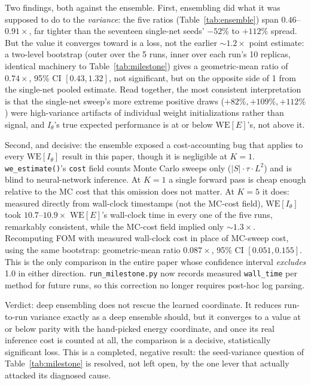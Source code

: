 \documentclass[11pt]{article}
\begin{document}
	Two findings, both against the ensemble. First, ensembling did what it was
	supposed to do to the \emph{variance}: the five ratios (Table~\ref{tab:ensemble}) span
	$0.46$--$0.91\times$, far tighter than the seventeen single-net seeds' $-52\%$ to
	$+112\%$ spread. But the value it converges toward is a loss, not the earlier
	$\sim\!1.2\times$ point estimate: a two-level bootstrap (outer over the 5 runs, inner over
	each run's 10 replicas, identical machinery to Table~\ref{tab:milestone}) gives a
	geometric-mean ratio of $0.74\times$, 95\% CI $[0.43, 1.32]$, not significant, but on the
	opposite side of 1 from the single-net pooled estimate. Read together, the most consistent
	interpretation is that the single-net sweep's more extreme positive draws ($+82\%,
	+109\%, +112\%$) were high-variance artifacts of individual weight initializations rather
	than signal, and $I_\theta$'s true expected performance is at or below
	$\mathrm{WE}[E]$'s, not above it.

	Second, and decisive: the ensemble exposed a cost-accounting bug that applies to
		every $\mathrm{WE}[I_\theta]$ result in this paper, though it is negligible at
		$K=1$. \texttt{we\_estimate()}'s \texttt{cost} field counts Monte Carlo sweeps only
	($|S|\cdot\tau\cdot L^2$) and is blind to neural-network inference. At $K=1$ a single
	forward pass is cheap enough relative to the MC cost that this omission does not matter.
	At $K=5$ it does: measured directly from wall-clock timestamps (not the MC-cost field),
	$\mathrm{WE}[I_\theta]$ took $10.7$--$10.9\times$ $\mathrm{WE}[E]$'s wall-clock time in
	every one of the five runs, remarkably consistent, while the MC-cost field implied
	only $\sim\!1.3\times$. Recomputing FOM with measured wall-clock cost in place of MC-sweep
	cost, using the same bootstrap: geometric-mean ratio $0.087\times$, 95\% CI $[0.051,
	0.155]$. This is the only comparison in the entire paper whose confidence interval
	\emph{excludes} 1.0 in either direction. \texttt{run\_milestone.py} now records
	measured \texttt{wall\_time} per method for future runs, so this correction no longer
	requires post-hoc log parsing.

	Verdict: deep ensembling does not rescue the learned coordinate. It reduces
	run-to-run variance exactly as a deep ensemble should, but it converges to a value at or
	below parity with the hand-picked energy coordinate, and once its real inference cost is
	counted at all, the comparison is a decisive, statistically significant loss. This is a
	completed, negative result: the seed-variance question of Table~\ref{tab:milestone} is
	resolved, not left open, by the one lever that actually attacked its diagnosed cause.
\end{document}
